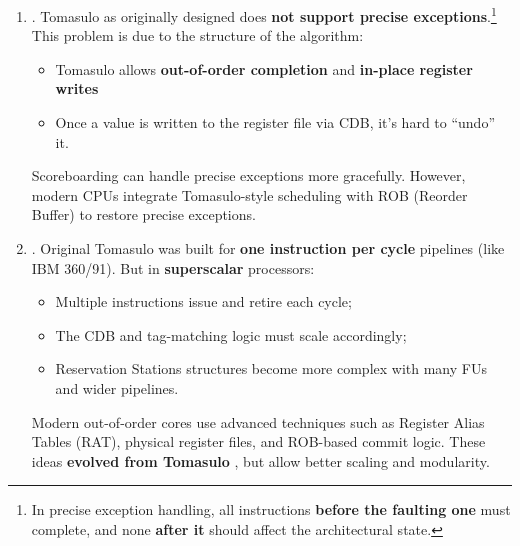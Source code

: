 \begin{enumerate}
    
    \item {}. Tomasulo as originally designed does \textbf{not support precise exceptions}.\footnote{In precise exception handling, all instructions \textbf{before the faulting one} must complete, and none \textbf{after it} should affect the architectural state.} This problem is due to the structure of the algorithm:
    \begin{itemize}
        \item Tomasulo allows \textbf{out-of-order completion} and \textbf{in-place register writes}
        \item Once a value is written to the register file via CDB, it's hard to ``undo'' it.
    \end{itemize}
    Scoreboarding can handle precise exceptions more gracefully. However, modern CPUs integrate Tomasulo-style scheduling with ROB (Reorder Buffer) to restore precise exceptions.
    
    
    \item {}. Original Tomasulo was built for \textbf{one instruction per cycle} pipelines (like IBM 360/91). But in \textbf{superscalar} processors:
    \begin{itemize}
        \item Multiple instructions issue and retire each cycle;
        \item The CDB and tag-matching logic must scale accordingly;
        \item Reservation Stations structures become more complex with many FUs and wider pipelines.
    \end{itemize}
    Modern out-of-order cores use advanced techniques such as Register Alias Tables (RAT), physical register files, and ROB-based commit logic. These ideas \textbf{evolved from Tomasulo} , but allow better scaling and modularity.
\end{enumerate}